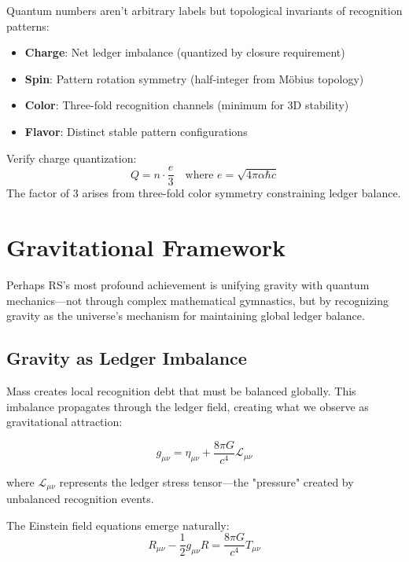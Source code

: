\documentclass[12pt,a4paper]{article}
\theoremstyle{definition}
\begin{document}
Quantum numbers aren't arbitrary labels but topological invariants of recognition patterns:

\begin{itemize}
    \item \textbf{Charge}: Net ledger imbalance (quantized by closure requirement)
    \item \textbf{Spin}: Pattern rotation symmetry (half-integer from Möbius topology)
    \item \textbf{Color}: Three-fold recognition channels (minimum for 3D stability)
    \item \textbf{Flavor}: Distinct stable pattern configurations
\end{itemize}

\begin{verifybox}
Verify charge quantization:
\begin{equation}
    Q = n \cdot \frac{e}{3} \quad \text{where } e = \sqrt{4\pi\alpha\hbar c}
\end{equation}
The factor of 3 arises from three-fold color symmetry constraining ledger balance.
\end{verifybox}

\section{Gravitational Framework}

Perhaps RS's most profound achievement is unifying gravity with quantum mechanics—not through complex mathematical gymnastics, but by recognizing gravity as the universe's mechanism for maintaining global ledger balance.

\subsection{Gravity as Ledger Imbalance}

Mass creates local recognition debt that must be balanced globally. This imbalance propagates through the ledger field, creating what we observe as gravitational attraction:

\begin{equation}
    g_{\mu\nu} = \eta_{\mu\nu} + \frac{8\pi G}{c^4} \mathcal{L}_{\mu\nu}
\end{equation}

where $\mathcal{L}_{\mu\nu}$ represents the ledger stress tensor—the "pressure" created by unbalanced recognition events.

The Einstein field equations emerge naturally:
\begin{equation}
    R_{\mu\nu} - \frac{1}{2}g_{\mu\nu}R = \frac{8\pi G}{c^4}T_{\mu\nu}
\end{equation}
\end{document}
